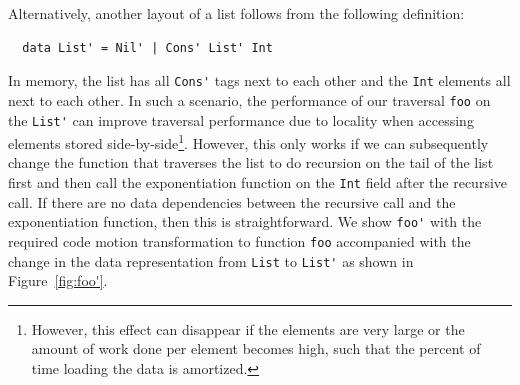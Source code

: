 Alternatively, another layout of a list follows from the following definition:
\begin{lstlisting}
  data List' = Nil' | Cons' List' Int
\end{lstlisting}
%
In memory, the list has all \lstinline|Cons'| tags next to each other  and the \lstinline|Int| elements all next to each other.
%
In such a scenario, the performance of our traversal \lstinline|foo| on the \lstinline|List'| can improve 
% 
traversal performance due to locality when accessing elements stored side-by-side\footnote{However, this effect can disappear if the elements are very large or the amount of work done per element becomes high, such that the percent of time loading the data is amortized.}.
%
However, this only works if we
can subsequently change the function that traverses the list to do recursion on the tail of the list first and then call the exponentiation
function on the \lstinline|Int| field after the recursive call. If there are no data dependencies between the recursive call and the exponentiation
function, then this is straightforward. We show \lstinline|foo'| with the required code motion transformation to function \lstinline|foo| accompanied
with the change in the data representation from \lstinline|List| to \lstinline|List'| as shown in Figure~\ref{fig:foo'}.



				

